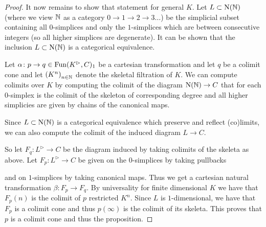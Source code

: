 \begin{lemma}
\begin{proof}
        It now remains to show that statement for general $K$.
        Let $L\subset\operatorname{N}(\mathbb{N})$ (where we view $\mathbb{N}$ as a category $0\to1\to2\to3\ldots$) be the simplicial subset containing all $0$-simplices and only the $1$-simplices which are between consecutive integers (so all higher simplices are degenerate).
        It can be shown that the inclusion $L\subset\operatorname{N}(\mathbb{N})$ is a categorical equivalence. %

        Let $\alpha\colon p\to q\in\operatorname{Fun}(K^{\rhd},C)_1$ be a cartesian transformation and let $q$ be a colimit cone and let $\left(K^n\right)_{n\in\mathbb{N}}$ denote the skeletal filtration of $K$.
        We can compute colimits over $K$ by computing the colimit of the diagram $\operatorname{N}(\mathbb{N})\to C$ that for each $0$-simplex is the colimit of the skeleton of corresponding degree and all higher simplicies are given by chains of the canonical maps. 

        Since $L\subset\operatorname{N}(\mathbb{N})$ is a categorical equivalence which preserve and reflect (co)limits, we can also compute the colimit of the induced diagram $L\to C$.

        So let $F_q\colon L^{\rhd}\to C$ be the diagram induced by taking colimits of the skeleta as above.
        Let $F_p\colon L^{\rhd}\to C$ be given on the $0$-simplices by taking pullbacks
        \begin{center}
        \end{center}
        and on $1$-simplices by taking canonical maps.
        Thus we get a cartesian natural transformation $\beta\colon F_p\to F_q$.
        By universality for finite dimensional $K$ we have that $F_p(n)$ is the colimit of $p$ restricted $K^n$.
        Since $L$ is $1$-dimensional, we have that $F_p$ is a colimit cone and thus $p(\infty)$ is the colimit of its skeleta.
        This proves that $p$ is a colimit cone and thus the proposition.
    \end{proof}
\end{lemma}
